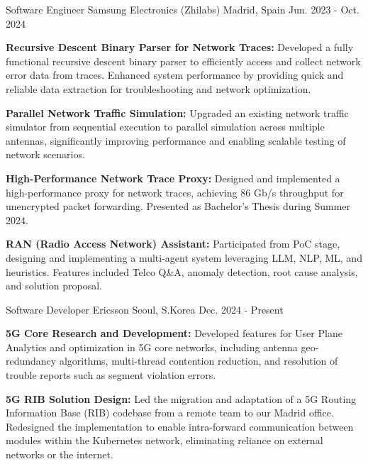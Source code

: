 
\begin{cventries}

  \cventry
    {Software Engineer} %
    {Samsung Electronics (Zhilabs)} %
    {Madrid, Spain} %
    {Jun. 2023 - Oct. 2024} %
    {
      \begin{cvitems} %
        \item {\textbf{Recursive Descent Binary Parser for Network Traces:} Developed a fully functional recursive descent binary parser to efficiently access and collect network error data from traces. Enhanced system performance by providing quick and reliable data extraction for troubleshooting and network optimization.}
        \item {\textbf{Parallel Network Traffic Simulation:} Upgraded an existing network traffic simulator from sequential execution to parallel simulation across multiple antennas, significantly improving performance and enabling scalable testing of network scenarios.}
        \item {\textbf{High-Performance Network Trace Proxy:} Designed and implemented a high-performance proxy for network traces, achieving 86 Gb/s throughput for unencrypted packet forwarding. Presented as Bachelor's Thesis during Summer 2024.}
        \item {\textbf{RAN (Radio Access Network) Assistant:} Participated from PoC stage, designing and implementing a multi-agent system leveraging LLM, NLP, ML, and heuristics. Features included Telco Q\&A, anomaly detection, root cause analysis, and solution proposal.}
      \end{cvitems}
    }

  \cventry
    {Software Developer} %
    {Ericsson} %
    {Seoul, S.Korea} %
    {Dec. 2024 - Present} %
    {
      \begin{cvitems} %
        \item {\textbf{5G Core Research and Development:} Developed features for User Plane Analytics and optimization in 5G core networks, including antenna geo-redundancy algorithms, multi-thread contention reduction, and resolution of trouble reports such as segment violation errors.}
        \item {\textbf{5G RIB Solution Design:} Led the migration and adaptation of a 5G Routing Information Base (RIB) codebase from a remote team to our Madrid office. Redesigned the implementation to enable intra-forward communication between modules within the Kubernetes network, eliminating reliance on external networks or the internet.}
      \end{cvitems}
    }

\end{cventries}



